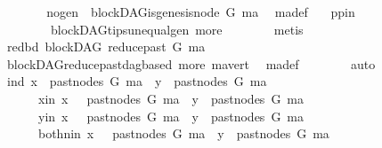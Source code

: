 \begin{isabellebody}
\ \ \ \ \isamarkupfalse%
\ \isamarkupfalse%
\ no{\isacharunderscore}{\kern0pt}gen{\isacharcolon}{\kern0pt}\ {\isachardoublequoteopen}{\isasymnot}\ blockDAG{\isachardot}{\kern0pt}is{\isacharunderscore}{\kern0pt}genesis{\isacharunderscore}{\kern0pt}node\ G\ ma{\isachardoublequoteclose}\ \isamarkupfalse%
\ ma{\isacharunderscore}{\kern0pt}def\ \ \isamarkupfalse%
\ pp{\isacharunderscore}{\kern0pt}in\ \isanewline
\ \ \ \ \ \ \ \ blockDAG{\isachardot}{\kern0pt}tips{\isacharunderscore}{\kern0pt}unequal{\isacharunderscore}{\kern0pt}gen\ more\isanewline
\ \ \ \ \ \ \isamarkupfalse%
\ metis\isanewline
\ \ \ \ \isamarkupfalse%
\ \isamarkupfalse%
\ red{\isacharunderscore}{\kern0pt}bd{\isacharcolon}{\kern0pt}\ {\isachardoublequoteopen}blockDAG\ {\isacharparenleft}{\kern0pt}reduce{\isacharunderscore}{\kern0pt}past\ G\ ma{\isacharparenright}{\kern0pt}{\isachardoublequoteclose}\ \ \isanewline
\ \ \ \ \ \ \isamarkupfalse%
\ blockDAG{\isachardot}{\kern0pt}reduce{\isacharunderscore}{\kern0pt}past{\isacharunderscore}{\kern0pt}dagbased\ more\ ma{\isacharunderscore}{\kern0pt}vert\ \isamarkupfalse%
\ ma{\isacharunderscore}{\kern0pt}def\isanewline
\ \ \ \ \ \ \isamarkupfalse%
\ auto\isanewline
\ \ \ \ \isamarkupfalse%
\ {\isacharparenleft}{\kern0pt}ind{\isacharparenright}{\kern0pt}\ {\isachardoublequoteopen}x\ {\isasymin}\ past{\isacharunderscore}{\kern0pt}nodes\ G\ ma\ {\isasymand}\ y\ {\isasymin}\ past{\isacharunderscore}{\kern0pt}nodes\ G\ ma{\isachardoublequoteclose}\isanewline
\ \ \ \ \ \ {\isacharbar}{\kern0pt}{\isacharparenleft}{\kern0pt}x{\isacharunderscore}{\kern0pt}in{\isacharparenright}{\kern0pt}\ {\isachardoublequoteopen}x\ {\isasymnotin}\ \ past{\isacharunderscore}{\kern0pt}nodes\ G\ ma\ {\isasymand}\ y\ {\isasymin}\ past{\isacharunderscore}{\kern0pt}nodes\ G\ ma{\isachardoublequoteclose}\isanewline
\ \ \ \ \ \ {\isacharbar}{\kern0pt}{\isacharparenleft}{\kern0pt}y{\isacharunderscore}{\kern0pt}in{\isacharparenright}{\kern0pt}\ {\isachardoublequoteopen}x\ {\isasymin}\ \ past{\isacharunderscore}{\kern0pt}nodes\ G\ ma\ {\isasymand}\ y\ {\isasymnotin}\ past{\isacharunderscore}{\kern0pt}nodes\ G\ ma{\isachardoublequoteclose}\isanewline
\ \ \ \ \ \ {\isacharbar}{\kern0pt}{\isacharparenleft}{\kern0pt}both{\isacharunderscore}{\kern0pt}nin{\isacharparenright}{\kern0pt}\ {\isachardoublequoteopen}x\ {\isasymnotin}\ \ past{\isacharunderscore}{\kern0pt}nodes\ G\ ma\ {\isasymand}\ y\ {\isasymnotin}\ past{\isacharunderscore}{\kern0pt}nodes\ G\ ma{\isachardoublequoteclose}\ \isamarkupfalse%

\end{isabellebody}
